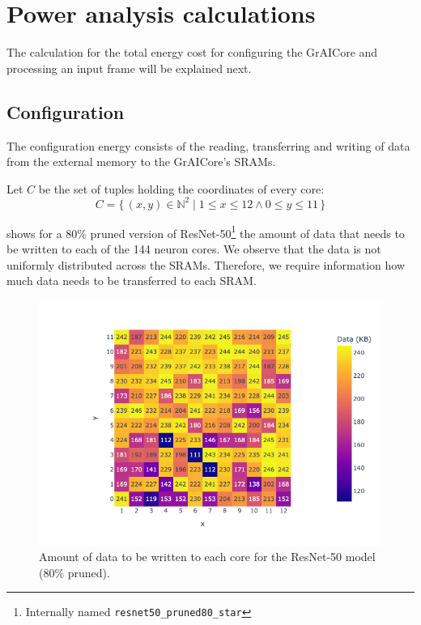\section{Power analysis calculations}
The calculation for the total energy cost for configuring the GrAICore and processing an input frame will be explained next.

\subsection{Configuration}
The configuration energy consists of the reading, transferring and writing of data from the external memory to the GrAICore's SRAMs. 

Let $C$ be the set of tuples holding the coordinates of every core:
\begin{equation}
    C = \{\,\left(x,y\right) \in \mathbb{N}^2 \mid 1 \leq x \leq 12 \wedge 0 \leq y \leq 11 \,\} 
\end{equation}

 shows for a 80\% pruned version of ResNet-50\footnote{Internally named \texttt{resnet50\_pruned80\_star}} the amount of data that needs to be written to each of the 144 neuron cores.
We observe that the data is not uniformly distributed across the SRAMs.
Therefore, we require information how much data needs to be transferred to each SRAM.

\begin{figure}[hbtp]
    \centering
    \includegraphics[width=0.8\linewidth]{assets/model_data_heatmap.png}
    \caption{Amount of data to be written to each core for the ResNet-50 model (80\% pruned).}
    \label{fig:model_data_heapmap}
\end{figure}

